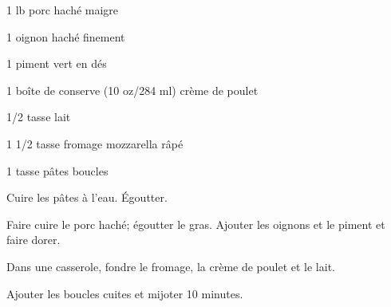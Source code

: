 %
%   
%   
%   
%




\totaltime{}


\begin{ingredients}
    \item 1 lb porc haché maigre
    \item 1 oignon haché finement
    \item 1 piment vert en dés
    \item 1 boîte de conserve (10 oz/284 ml) crème de poulet
    \item 1/2 tasse lait
    \item 1 1/2 tasse fromage mozzarella râpé
    \item 1 tasse pâtes boucles
\end{ingredients}

\begin{steps}
    \item Cuire les pâtes à l'eau. Égoutter.
    \item Faire cuire le porc haché; égoutter le gras. Ajouter les oignons et le piment et faire dorer.
    \item Dans une casserole, fondre le fromage, la crème de poulet et le lait.
    \item Ajouter les boucles cuites et mijoter 10 minutes.
\end{steps}
